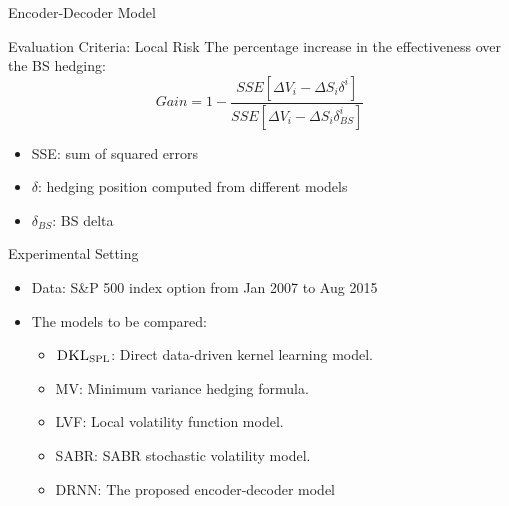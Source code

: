 \documentclass[10pt,table,mathserif]{beamer}
\newcommand{\vx}{\mathbf{x}}
\newcommand{\DKLs}{\bf\textsc{DKL}_{\text{SPL}}}
\begin{document}
\begin{frame}[fragile]{Encoder-Decoder Model}
\begin{figure}
{
}
\end{figure}
\end{frame}


\begin{frame}{Evaluation Criteria: Local Risk}
The percentage increase in the effectiveness over the BS hedging:
\[
Gain=1-\frac{SSE[\Delta V_i-\Delta S_i\delta^i]}{SSE[\Delta V_i-\Delta S_i\delta^i_{BS}]}
\]

\begin{itemize}
  \item SSE: sum of squared errors
  \item $\delta$: hedging position computed from different models
  \item $\delta_{BS}$: BS delta
\end{itemize}
\end{frame}

\begin{frame}{Experimental Setting}
\begin{itemize}
\item Data: S\&P 500 index option from Jan 2007 to Aug 2015
\item The models to be compared:
\begin{itemize}
	\item $\DKLs$: Direct data-driven kernel learning model.
	\item MV: Minimum variance hedging formula.
	\item LVF: Local volatility function model.
	\item SABR: SABR stochastic volatility model.
    \item DRNN: The proposed encoder-decoder model
\end{itemize}
\end{itemize}

\end{frame}
\end{document}
